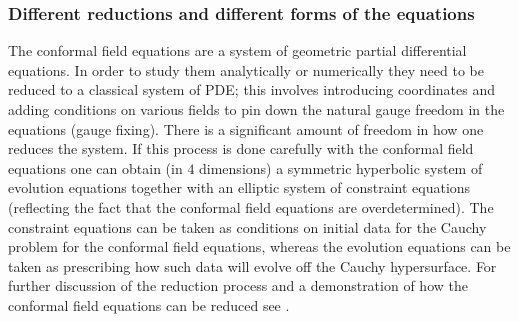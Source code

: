 \documentclass[a4paper,12pt]{amsart}
\theoremstyle{remark}
\begin{document}
\subsubsection{Different reductions and different forms of the equations}

The conformal field equations are a system of geometric partial differential
equations. In order to study them analytically or numerically they
need to be reduced to a classical system of PDE; this involves introducing
coordinates and adding conditions on various fields to pin down the
natural gauge freedom in the equations (gauge fixing). There is a
significant amount of freedom in how one reduces the system. If this
process is done carefully with the conformal field equations one can
obtain (in $4$ dimensions) a symmetric hyperbolic system of evolution equations together with an elliptic system of constraint equations (reflecting the fact that the conformal field equations are overdetermined). The constraint equations can be taken as conditions on initial data for the Cauchy problem for the conformal field equations, whereas the evolution equations can be taken as prescribing how such data will evolve off the Cauchy hypersurface. For further discussion of the
reduction process and a demonstration of how the conformal field equations
can be reduced see \cite{Joerg-ConfInf}.
\end{document}
